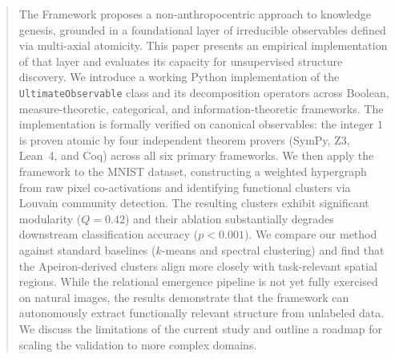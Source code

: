 \begin{abstract}
The \Apeiron{} Framework proposes a non-anthropocentric approach to knowledge genesis, grounded in a foundational layer of irreducible observables defined via multi-axial atomicity. This paper presents an empirical implementation of that layer and evaluates its capacity for unsupervised structure discovery. We introduce a working Python implementation of the \texttt{UltimateObservable} class and its decomposition operators across Boolean, measure-theoretic, categorical, and information-theoretic frameworks. The implementation is formally verified on canonical observables: the integer $1$ is proven atomic by four independent theorem provers (SymPy, Z3, Lean~4, and Coq) across all six primary frameworks. We then apply the framework to the MNIST dataset, constructing a weighted hypergraph from raw pixel co-activations and identifying functional clusters via Louvain community detection. The resulting clusters exhibit significant modularity ($Q = 0.42$) and their ablation substantially degrades downstream classification accuracy ($p < 0.001$). We compare our method against standard baselines ($k$-means and spectral clustering) and find that the Apeiron-derived clusters align more closely with task-relevant spatial regions. While the relational emergence pipeline is not yet fully exercised on natural images, the results demonstrate that the framework can autonomously extract functionally relevant structure from unlabeled data. We discuss the limitations of the current study and outline a roadmap for scaling the validation to more complex domains.
\end{abstract}